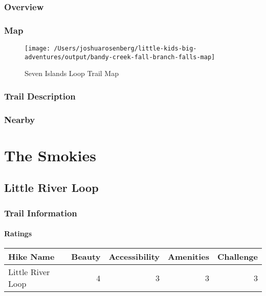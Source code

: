 \documentclass[
]{book}
\begin{document}
\hypertarget{overview-11}{%
\section{Overview}\label{overview-11}}

\hypertarget{map-11}{%
\section{Map}\label{map-11}}

\begin{figure}
\texttt{[image: /Users/joshuarosenberg/little-kids-big-adventures/output/bandy-creek-fall-branch-falls-map]} \caption{Seven Islands Loop Trail Map}\label{fig:unnamed-chunk-31}
\end{figure}

\hypertarget{trail-description-11}{%
\section{Trail Description}\label{trail-description-11}}

\hypertarget{nearby-11}{%
\section{Nearby}\label{nearby-11}}

\hypertarget{part-the-smokies}{%
\part{The Smokies}\label{part-the-smokies}}

\hypertarget{little-river-loop}{%
\chapter{Little River Loop}\label{little-river-loop}}

\hypertarget{trail-information-12}{%
\section{Trail Information}\label{trail-information-12}}

\hypertarget{ratings-7}{%
\subsection{Ratings}\label{ratings-7}}

\begin{tabular}{l|r|r|r|r}
\hline
Hike Name & Beauty & Accessibility & Amenities & Challenge\\
\hline
Little River Loop & 4 & 3 & 3 & 3\\
\hline
\end{tabular}
\end{document}
